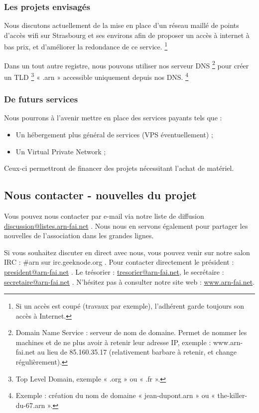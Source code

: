\subsubsection{Les projets envisagés}
Nous discutons actuellement de la mise en place d'un réseau maillé de points 
d'accès wifi sur Strasbourg et ses environs afin de proposer un accès à internet 
à bas prix, et d'améliorer la redondance de ce service.
\protect\footnote{
	Si un accès est coupé (travaux par exemple), l'adhérent garde toujours son 
		accès à Internet.
}

Dans un tout autre registre, nous pouvons utiliser nos serveur DNS
\protect\footnote{
	Domain Name Service : serveur de nom de domaine.
	Permet de nommer les machines et de ne plus avoir à retenir leur adresse 
	IP, exemple : www.arn-fai.net au lieu de 85.160.35.17 (relativement 
			barbare à retenir, et change régulièrement).
}
	pour créer un TLD
\protect\footnote{
	Top Level Domain, exemple « .org » ou « .fr ».
}
	 « .arn » accessible uniquement depuis nos DNS.
\protect\footnote{
	Exemple : création du nom de domaine « jean-dupont.arn » ou « the-killer-du-67.arn ».
}

\subsubsection{De futurs services}
Nous pourrons à l'avenir mettre en place des services payants tels que :
\begin{itemize}
	\item Un hébergement plus général de services (VPS éventuellement) ;
	\item Un Virtual Private Network ;
\end{itemize}
Ceux-ci permettront de financer des projets nécessitant l'achat de matériel.

\subsection{Nous contacter - nouvelles du projet}
Vous pouvez nous contacter par e-mail via notre liste de diffusion 
\href{mailto:discussion@listes.arn-fai.net}{discussion@listes.arn-fai.net} .
Nous nous en servons également pour partager les nouvelles de l'association 
dans les grandes lignes.

Si vous souhaitez discuter en direct avec nous, vous pouvez venir sur notre 
salon IRC : \#arn sur irc.geeknode.org .
Pour contacter directement le président : 
\href{mailto:president@arn-fai.net}{president@arn-fai.net} .
Le trésorier : \href{mailto:tresorier@arn-fai.net}{tresorier@arn-fai.net}, 
   le secrétaire : \href{mailto:secretaire@arn-fai.net}{secretaire@arn-fai.net} .
N'hésitez pas à consulter notre site web : \href{http://www.arn-fai.net}{www.arn-fai.net}.

